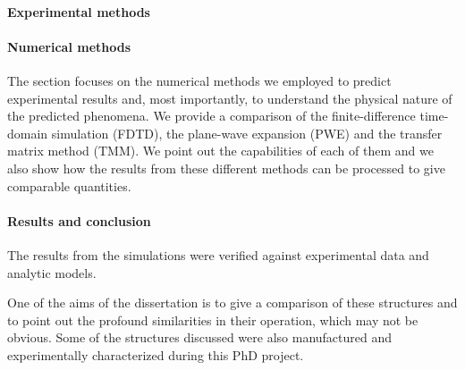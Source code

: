 \paragraph{Experimental methods} %



\paragraph{Numerical methods} %
The  section focuses on the numerical methods we employed to predict experimental results and, most importantly, to understand the physical nature of the predicted phenomena. We provide a comparison of the finite-difference time-domain simulation (FDTD), the plane-wave expansion (PWE) and the transfer matrix method (TMM). We point out the capabilities of each of them and we also show how the results from these different methods can be processed to give comparable quantities.

\paragraph{Results and conclusion} %

The results from the simulations were verified against experimental data and analytic models.

One of the aims of the dissertation is to give a comparison of these structures and to point out the profound similarities in their operation, which may not be obvious.  Some of the structures discussed were also manufactured and experimentally characterized during this PhD project. 

